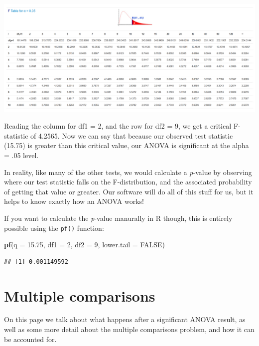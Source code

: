 \documentclass[
]{book}
\newenvironment{Shaded}{\begin{snugshade}}{\end{snugshade}}
\newcommand{\AttributeTok}[1]{\textcolor[rgb]{0.13,0.29,0.53}{#1}}
\newcommand{\ConstantTok}[1]{\textcolor[rgb]{0.56,0.35,0.01}{#1}}
\newcommand{\DecValTok}[1]{\textcolor[rgb]{0.00,0.00,0.81}{#1}}
\newcommand{\FloatTok}[1]{\textcolor[rgb]{0.00,0.00,0.81}{#1}}
\newcommand{\FunctionTok}[1]{\textcolor[rgb]{0.13,0.29,0.53}{\textbf{#1}}}
\newcommand{\NormalTok}[1]{#1}
\begin{document}
\includegraphics[width=29.76in]{img/w9_f-table}

Reading the column for df1 = 2, and the row for df2 = 9, we get a
critical F-statistic of 4.2565. Now we can say that because our observed
test statistic (15.75) is greater than this critical value, our ANOVA is
significant at the alpha = .05 level.

In reality, like many of the other tests, we would calculate a \emph{p}-value
by observing where our test statistic falls on the F-distribution, and
the associated probability of getting that value or greater. Our
software will do all of this stuff for us, but it helps to know exactly
how an ANOVA works!

If you want to calculate the \emph{p}-value manurally in R though, this is entirely possible using the \texttt{pf()} function:

\begin{Shaded}
\begin{Highlighting}[]
\FunctionTok{pf}\NormalTok{(}\AttributeTok{q =} \FloatTok{15.75}\NormalTok{, }\AttributeTok{df1 =} \DecValTok{2}\NormalTok{, }\AttributeTok{df2 =} \DecValTok{9}\NormalTok{, }\AttributeTok{lower.tail =} \ConstantTok{FALSE}\NormalTok{)}
\end{Highlighting}
\end{Shaded}

\begin{verbatim}
## [1] 0.001149592
\end{verbatim}

\hypertarget{multiple-comparisons}{%
\section{Multiple comparisons}\label{multiple-comparisons}}

On this page we talk about what happens after a significant ANOVA
result, as well as some more detail about the multiple comparisons
problem, and how it can be accounted for.
\end{document}
